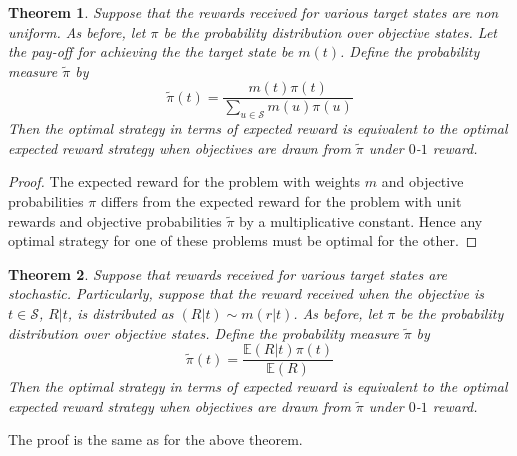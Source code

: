 \documentclass{article}
\newtheorem{theorem}{Theorem}
\newcommand{\EE}{\mathbb{E}}
\newcommand{\Ss}{\mathcal{S}}
\begin{document}
\begin{theorem}
Suppose that the rewards received for various target states are non uniform. As before, let $\pi$ be the probability distribution over objective states. 
Let the pay-off for achieving the the target state be $m(t)$. 
Define the probability measure $\tilde{\pi}$ by
\[\tilde{\pi}(t)=\frac{m(t)\pi(t)}{\sum_{u\in\Ss} m(u)\pi(u)}\] 
Then the optimal strategy in terms of expected reward is equivalent to the optimal expected reward strategy when objectives are drawn from $\tilde{\pi}$ under $0$-$1$ reward.
\end{theorem}
\begin{proof}
The expected reward for the problem with weights $m$ and objective probabilities $\pi$ differs from the expected reward for the problem with unit rewards and objective probabilities $\tilde{\pi}$ by a multiplicative constant. Hence any optimal strategy for one of these problems must be optimal for the other. 
\end{proof}
\begin{theorem} 
Suppose that rewards received for various target states are stochastic. Particularly, suppose that the reward received when the objective is $t\in\Ss$, $R|t$, is distributed as $(R|t)\sim m(r|t)$. As before, let $\pi$ be the probability distribution over objective states. Define the probability measure $\tilde{\pi}$ by
\[\tilde{\pi}(t)=\frac{\EE(R|t)\pi(t)}{\EE(R)}\] 
Then the optimal strategy in terms of expected reward is equivalent to the optimal expected reward strategy when objectives are drawn from $\tilde{\pi}$ under $0$-$1$ reward.
\end{theorem}
The proof is the same as for the above theorem.
\end{document}
